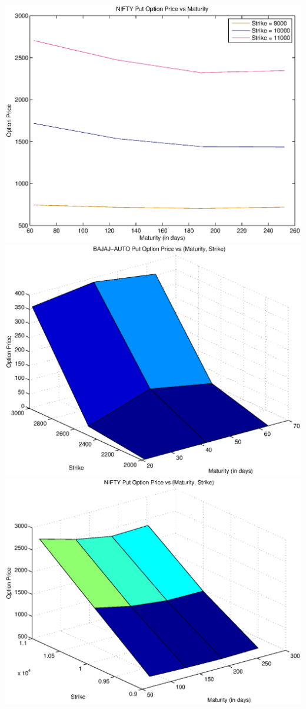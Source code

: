 \documentclass{article}
\begin{document}
\includegraphics[width=\textwidth]{NIFTY_Put_Option_Price_vs_Maturity} \\
\includegraphics[width=\textwidth]{BAJAJ-AUTO_Put_Option_Price_vs_(Maturity,_Strike)} \\   
\includegraphics[width=\textwidth]{NIFTY_Put_Option_Price_vs_(Maturity,_Strike)} \\
\end{document}
